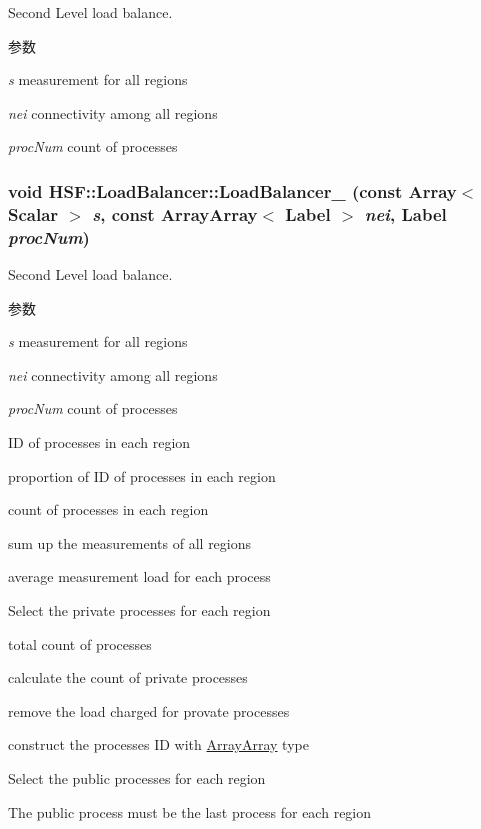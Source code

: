 Second Level load balance. 
\begin{DoxyParams}{参数}
\item[{\em s}]measurement for all regions \item[{\em nei}]connectivity among all regions \item[{\em procNum}]count of processes \end{DoxyParams}
\hypertarget{classHSF_1_1LoadBalancer_a06147f535aa0c290b332c9578d80d3fa}{
\subsubsection[{LoadBalancer\_\-2}]{\setlength{\rightskip}{0pt plus 5cm}void HSF::LoadBalancer::LoadBalancer\_ (const Array$<$ {\bf Scalar} $>$ {\em s}, \/  const {\bf ArrayArray}$<$ {\bf Label} $>$ {\em nei}, \/  {\bf Label} {\em procNum})}}
\label{classHSF_1_1LoadBalancer_a06147f535aa0c290b332c9578d80d3fa}


Second Level load balance. 
\begin{DoxyParams}{参数}
\item[{\em s}]measurement for all regions \item[{\em nei}]connectivity among all regions \item[{\em procNum}]count of processes \end{DoxyParams}


ID of processes in each region

proportion of ID of processes in each region

count of processes in each region

sum up the measurements of all regions

average measurement load for each process

Select the private processes for each region

total count of processes

calculate the count of private processes

remove the load charged for provate processes

construct the processes ID with \hyperlink{classHSF_1_1ArrayArray}{ArrayArray} type

Select the public processes for each region

The public process must be the last process for each region

